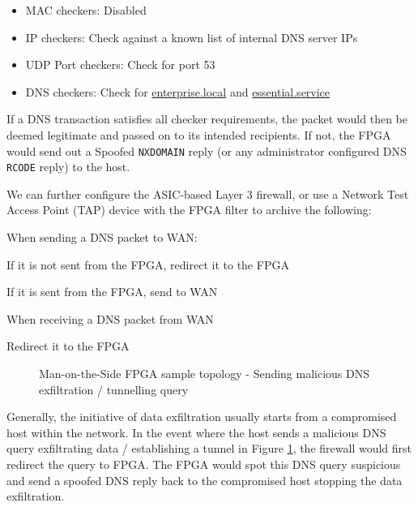 \documentclass[a4paper]{report}
\newcommand{\code}{\texttt}
\newcommand{\SubItem}[1]{
    {\setlength\itemindent{15pt} \item[-] #1}
}
\begin{document}
\begin{itemize}
    \item MAC checkers: Disabled
    \item IP checkers: Check against a known list of internal DNS server IPs
    \item UDP Port checkers: Check for port 53
    \item DNS checkers: Check for \url{enterprise.local} and \url{essential.service}
\end{itemize}

If a DNS transaction satisfies all checker requirements, the packet would then be deemed legitimate and passed on to its intended recipients. If not, the FPGA would send out a Spoofed \code{NXDOMAIN} reply (or any administrator configured DNS \code{RCODE} reply) to the host.

We can further configure the ASIC-based Layer 3 firewall, or use a Network Test Access Point (TAP) device with the FPGA filter to archive the following:

\begin{itemize}
    \item When sending a DNS packet to WAN:
        \SubItem    {If it is not sent from the FPGA, redirect it to the FPGA}
        \SubItem    {If it is sent from the FPGA, send to WAN}
    \item When receiving a DNS packet from WAN
        \SubItem    {Redirect it to the FPGA}
\end{itemize}


\begin{figure}[H]
  \caption{Man-on-the-Side FPGA sample topology - Sending malicious DNS exfiltration / tunnelling query}
  \label{fig:man-on-the-side-FPGA-send-malicious}
\end{figure}

Generally, the initiative of data exfiltration usually starts from a compromised host within the network. In the event where the host sends a malicious DNS query exfiltrating data / establishing a tunnel in Figure \ref{fig:man-on-the-side-FPGA-send-malicious}, the firewall would first redirect the query to FPGA. The FPGA would spot this DNS query suspicious and send a spoofed DNS reply back to the compromised host stopping the data exfiltration. 
\end{document}
